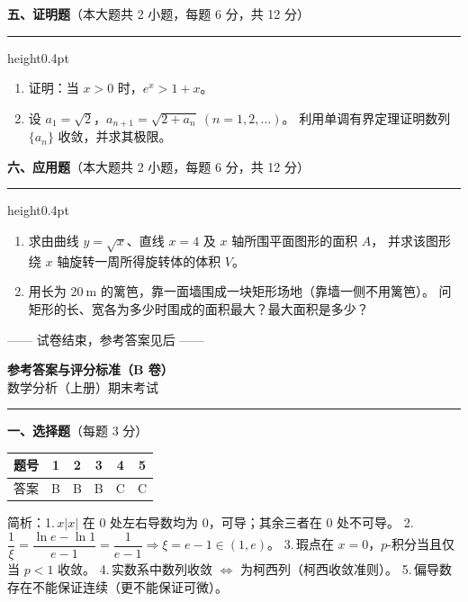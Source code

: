 \documentclass[12pt]{ctexart}
\newcommand{\bigsection}[2]{%
  \vspace{6pt}%
  {\noindent\bfseries\large #1}\hfill{\normalsize（本大题共 #2）}\par
  \vspace{2pt}\hrule height0.4pt\vspace{8pt}}
\begin{document}
\bigsection{五、证明题}{2 小题，每题 6 分，共 12 分}

\begin{enumerate}[label=\arabic*.]
\item 证明：当 $x>0$ 时，$e^{x}>1+x$。

\item 设 $a_{1}=\sqrt{2}$，$a_{n+1}=\sqrt{2+a_{n}}\ (n=1,2,\dots)$。
  利用单调有界定理证明数列 $\{a_{n}\}$ 收敛，并求其极限。
\end{enumerate}

\bigsection{六、应用题}{2 小题，每题 6 分，共 12 分}

\begin{enumerate}[label=\arabic*.]
\item 求由曲线 $y=\sqrt{x}$、直线 $x=4$ 及 $x$ 轴所围平面图形的面积 $A$，
  并求该图形绕 $x$ 轴旋转一周所得旋转体的体积 $V$。

\item 用长为 $20\ \mathrm{m}$ 的篱笆，靠一面墙围成一块矩形场地（靠墙一侧不用篱笆）。
  问矩形的长、宽各为多少时围成的面积最大？最大面积是多少？
\end{enumerate}

\vspace{8pt}
\begin{center}\small —— 试卷结束，参考答案见后 ——\end{center}

\clearpage
\begin{center}
  {\Large\bfseries 参考答案与评分标准（B 卷）}\\[2pt]
  {\small 数学分析（上册）期末考试}
\end{center}
\vspace{6pt}\hrule\vspace{12pt}

\noindent\textbf{一、选择题}（每题 3 分）\par\vspace{4pt}
\begin{center}
\renewcommand{\arraystretch}{1.3}
\begin{tabular}{|c|c|c|c|c|c|}
\hline
题号 & 1 & 2 & 3 & 4 & 5 \\\hline
答案 & B & B & B & C & C \\\hline
\end{tabular}
\end{center}
\noindent\small 简析：1.\,$x|x|$ 在 $0$ 处左右导数均为 $0$，可导；其余三者在 $0$ 处不可导。
2.\,$\dfrac{1}{\xi}=\dfrac{\ln e-\ln 1}{e-1}=\dfrac{1}{e-1}\Rightarrow\xi=e-1\in(1,e)$。
3.\,瑕点在 $x=0$，$p$-积分当且仅当 $p<1$ 收敛。
4.\,实数系中数列收敛 $\Leftrightarrow$ 为柯西列（柯西收敛准则）。
5.\,偏导数存在不能保证连续（更不能保证可微）。\normalsize
\end{document}
